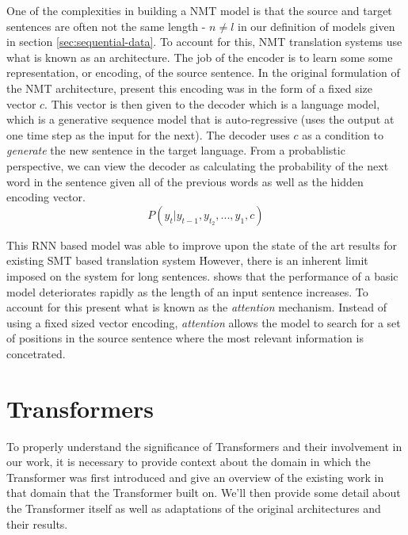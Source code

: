 One of the complexities in building a NMT model is that the source and target sentences are often not the same length - $n \neq l$ in our definition of \seq{} models given in section \ref{sec:sequential-data}. To account for this, NMT translation systems use what is known as an \ed{} architecture. The job of the encoder is to learn some some representation, or encoding, of the source sentence. In the original formulation of the \ed{} NMT architecture, \citet{cho2014learning} present this encoding was in the form of a fixed size vector $c$. This vector is then given to the decoder which is a language model, which is a generative sequence model that is auto-regressive (uses the output at one time step as the input for the next). The decoder uses $c$ as a condition to \emph{generate} the new sentence in the target language. From a probablistic perspective, we can view the decoder as calculating the probability of the next word in the sentence given all of the previous words as well as the hidden encoding vector. $$P(y_t \vert y_{t-1}, y_{t_2}, ..., y_1, c)$$

\newcommand{\at}[1]{\emph{#1}}

This RNN based \ed{} model was able to improve upon the state of the art results for existing SMT based translation system \. However, there is an inherent limit imposed on the system for long sentences. \citet{cho2014learning} shows that the performance of a basic \ed{} model deteriorates rapidly as the length of an input sentence increases. To account for this 
\citet{bahdanau2014neural} present what is known as the \at{attention} mechanism. Instead of using a fixed sized vector encoding, \at{attention} allows the model to search for a set of positions in the source sentence where the most relevant information is concetrated. 



\section{Transformers}
To properly understand the significance of Transformers and their involvement in our work, it is necessary to provide context about the domain in which the Transformer was first introduced and give an overview of the existing work in that domain that the Transformer built on. We'll then provide some detail about the Transformer itself as well as adaptations of the original architectures and their results. 

